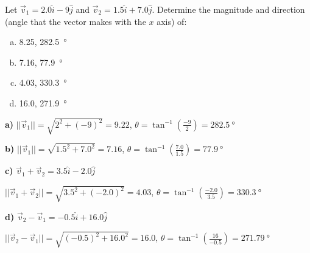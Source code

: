 \question Let $\vec v_1=2.0\hat i-9\hat j$ and $\vec v_2=1.5\hat i+7.0\hat j$. Determine the magnitude and direction (angle that the vector makes with the $x$ axis)  of:
\begin{finalanswer}
	\begin{enumerate}[(a)]
		\item 8.25, \SI{282.5}{\degree}
		\item 7.16, \SI{77.9}{\degree}
		\item 4.03, \SI{330.3}{\degree}
		\item 16.0, \SI{271.9}{\degree}
	\end{enumerate}
\end{finalanswer}
\begin{solution}
	\textbf{a)} $||\vec v_1||=\sqrt{2^2+(-9)^2}=9.22$, $\theta = \tan^{-1}(\frac{-9}{2})=\SI{282.5}{\degree}$
	
	\textbf{b)} $||\vec v_1||=\sqrt{1.5^2+7.0^2}=7.16$, $\theta = \tan^{-1}(\frac{7.0}{1.5})=\SI{77.9}{\degree}$
	
	\textbf{c)} $\vec v_1+\vec v_2=3.5\hat i-2.0\hat j$
	
	$||\vec v_1+\vec v_2||=\sqrt{3.5^2+(-2.0)^2}=4.03$, $\theta = \tan^{-1}(\frac{-2.0}{3.5})=\SI{330.3}{\degree}$
	
	\textbf{d)} $\vec v_2-\vec v_1=-0.5\hat i+16.0\hat j$
	
	$||\vec v_2-\vec v_1||=\sqrt{(-0.5)^2+16.0^2}=16.0$, $\theta = \tan^{-1}(\frac{16}{-0.5})=\SI{271.79}{\degree}$ 
\end{solution}


